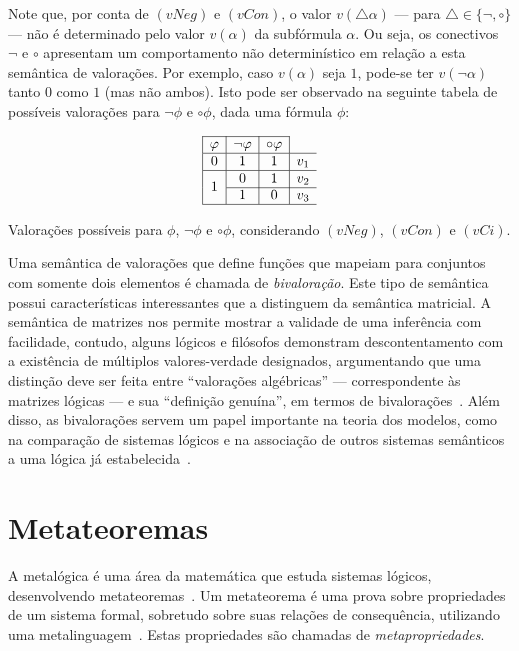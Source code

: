         Note que, por conta de $(vNeg)$ e $(vCon)$, o valor $v(\triangle \alpha)$ {---} para $\triangle \in \{\neg, \circ\}$ {---} não é determinado pelo valor $v(\alpha)$ da subfórmula $\alpha$. Ou seja, os conectivos $\neg$ e $\circ$ apresentam um comportamento não determinístico em relação a esta semântica de valorações. Por exemplo, caso $v(\alpha)$ seja $1$, pode-se ter $v(\neg \alpha)$ tanto $0$ como $1$ (mas não ambos). Isto pode ser observado na seguinte tabela de possíveis valorações para $\neg \phi$ e $\circ \phi$, dada uma fórmula $\phi$:

        \begin{table}[h]
            \[
                \begin{array}{|c|c|c|c}%
                    \cline{1-3}
                    \phi & \neg\phi & \circ\phi & \\ \hline%
                    0 & 1 & 1 & v_1 \\ \hline%
                    \multirow{2}{*}{1} & 0 & 1 & v_2 \\ \cline{2-4}
                    & 1 & 0 & v_3 \\ \hline%
                \end{array}
                \]
                \caption{Valorações possíveis para $\phi$, $\neg \phi$ e $\circ \phi$, considerando $(vNeg)$, $(vCon)$ e $(vCi)$.}\label{tab:negcirc}
        \end{table}

        Uma semântica de valorações que define funções que mapeiam para conjuntos com somente dois elementos é chamada de \textit{bivaloração}. Este tipo de semântica possui características interessantes que a distinguem da semântica matricial. A semântica de matrizes nos permite mostrar a validade de uma inferência com facilidade, contudo, alguns lógicos e filósofos demonstram descontentamento com a existência de múltiplos valores-verdade designados, argumentando que uma distinção deve ser feita entre ``valorações algébricas'' {---} correspondente às matrizes lógicas {---} e sua ``definição genuína'', em termos de bivalorações~\cite{Suszko1975-SUSROL}. Além disso, as bivalorações servem um papel importante na teoria dos modelos, como na comparação de sistemas lógicos e na associação de outros sistemas semânticos a uma lógica já estabelecida~\cite{bivalence}.

        
                
\section{Metateoremas}\label{sec:metateoremas}
    A metalógica é uma área da matemática que estuda sistemas lógicos, desenvolvendo metateoremas~\cite{Jacquette2002-JACACT-7}. Um metateorema é uma prova sobre propriedades de um sistema formal, sobretudo sobre suas relações de consequência, utilizando uma metalinguagem~\cite{Tarski1956-TARLSM, Rasiowa1963-RASTMO, Barile_2024}. Estas propriedades são chamadas de \textit{metapropriedades}. 
    
